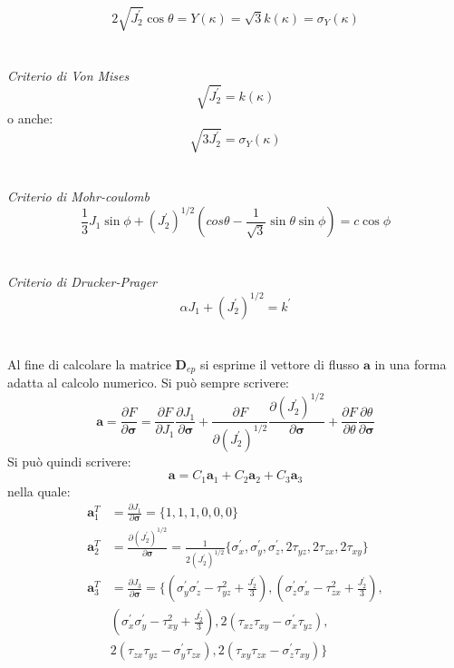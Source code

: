 \begin{equation}
	2 \sqrt{J^{'}_2} \cos \theta = Y(\kappa) = \sqrt{3} k(\kappa) = \sigma_Y(\kappa)
\end{equation}\\
\\
\emph{Criterio di Von Mises}
\begin{equation}
	\sqrt{J^{'}_2} = k(\kappa)
\end{equation}
o anche:
\begin{equation}
	\sqrt{3 J^{'}_2} = \sigma_Y(\kappa) 
\end{equation}\\
\\
\emph{Criterio di Mohr-coulomb}
\begin{equation}
	\frac{1}{3} J_1 \sin \phi + (J_2^{'})^{1/2}(cos \theta -\frac{1}{\sqrt{3}} \sin \theta \sin \phi) = c \cos \phi
\end{equation} \\
\\
\emph{Criterio di Drucker-Prager}
\begin{equation}
	\alpha J_1 + (J_2^{'})^{1/2} = k^{'}
\end{equation}\\
\\
Al fine di calcolare la matrice $\mathbf{D}_{ep}$ si esprime il vettore di flusso $\mathbf{a}$ in una forma adatta al calcolo numerico. Si può sempre scrivere:
\begin{equation}
	\mathbf{a} =  \frac{\partial F}{\partial \boldsymbol{\sigma}} = \frac{\partial F}{\partial J_1} \frac{\partial J_1}{\partial \boldsymbol{\sigma}} + \frac{\partial F}{\partial (J_2^{'})^{1/2}} \frac{\partial (J_2^{'})^{1/2}}{\partial \boldsymbol{\sigma}} + \frac{\partial F}{\partial \theta} \frac{\partial \theta}{\partial \boldsymbol{\sigma}}
\end{equation}
Si può quindi scrivere:
\begin{equation}
	\mathbf{a} = C_1 \mathbf{a}_1 + C_2 \mathbf{a}_2 + C_3 \mathbf{a}_3
\end{equation}
nella quale:
\begin{equation}
	\begin{split}
		\mathbf{a}_1^T & = \frac{\partial J_1}{\partial \boldsymbol{\sigma}} = 	\{ 1, 1, 1, 0, 0, 0 \}	\\
		\mathbf{a}_2^T & = \frac{\partial (J_2^{'})^{1/2}}{\partial \boldsymbol{\sigma}} = 	\frac{1}{2(J_2^{'})^{1/2}}\{\sigma_x^{'},  \sigma_y^{'}, \sigma_z^{'}, 2\tau_{yz}, 2\tau_{zx}, 2\tau_{xy} \}			\\
		\mathbf{a}_3^T & = \frac{\partial J_3}{\partial \boldsymbol{\sigma}} = \{ (\sigma_y^{'} \sigma_z^{'} - \tau_{yz}^2 + \frac{J_2^{'}}{3}), (\sigma_z^{'} \sigma_x^{'} - \tau_{zx}^2 + \frac{J_2^{'}}{3}),   \\
		               &  (\sigma_x^{'} \sigma_y^{'} - \tau_{xy}^2 + \frac{J_2^{'}}{3}), 2(\tau_{xz} \tau_{xy} - \sigma_x^{'} \tau_{yz} ), \\ & 2(\tau_{zx} \tau_{yz} - \sigma_y^{'} \tau_{zx} ), 2(\tau_{xy} \tau_{zx} - \sigma_z^{'} \tau_{xy}) \}
	\end{split}
\end{equation}
